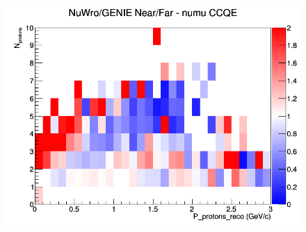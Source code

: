 \begin{figure}[h]
\endminipage
{}
\includegraphics[width=\linewidth]{eff_N_P/FGT/protons/ratios/CCQE_NuWro_GENIE_numu_NF_N_P.png}
\endminipage
\newline
\end{figure}
\clearpage

